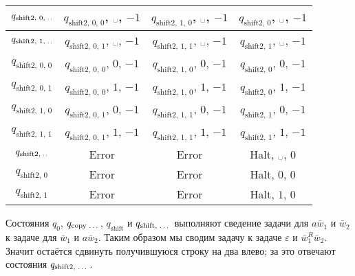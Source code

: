 \documentclass[12pt,a4paper]{article}
\newcommand{\spacesymbol}{\ensuremath{\text{\textvisiblespace}}}
\begin{document}
\begin{enumproblem}
\begin{table}[H]
\begin{tabular}{c||c|c|c}
                \hline
                $q_{\text{shift2, 0, \spacesymbol}}$& $q_{\text{shift2, 0, 0}}$, \spacesymbol, $-1$& $q_{\text{shift2, 1, 0}}$, \spacesymbol, $-1$& $q_{\text{shift2, 0}}$, \spacesymbol, $-1$\\
                \hline
                $q_{\text{shift2, 1, \spacesymbol}}$& $q_{\text{shift2, 0, 1}}$, \spacesymbol, $-1$& $q_{\text{shift2, 1, 1}}$, \spacesymbol, $-1$& $q_{\text{shift2, 1}}$, \spacesymbol, $-1$\\
                \hline
                $q_{\text{shift2, 0, 0}}$& $q_{\text{shift2, 0, 0}}$, $0$, $-1$& $q_{\text{shift2, 1, 0}}$, $0$, $-1$& $q_{\text{shift2, 0}}$, $0$, $-1$\\
                \hline
                $q_{\text{shift2, 0, 1}}$& $q_{\text{shift2, 0, 0}}$, $1$, $-1$& $q_{\text{shift2, 1, 0}}$, $1$, $-1$& $q_{\text{shift2, 0}}$, $1$, $-1$\\
                \hline
                $q_{\text{shift2, 1, 0}}$& $q_{\text{shift2, 0, 1}}$, $0$, $-1$& $q_{\text{shift2, 1, 1}}$, $0$, $-1$& $q_{\text{shift2, 1}}$, $0$, $-1$\\
                \hline
                $q_{\text{shift2, 1, 1}}$& $q_{\text{shift2, 0, 1}}$, $1$, $-1$& $q_{\text{shift2, 1, 1}}$, $1$, $-1$& $q_{\text{shift2, 1}}$, $1$, $-1$\\
                \hline
                $q_{\text{shift2, \spacesymbol}}$& Error& Error& Halt, \spacesymbol, $0$\\
                \hline
                $q_{\text{shift2, 0}}$& Error& Error& Halt, $0$, $0$\\
                \hline
                $q_{\text{shift2, 1}}$& Error& Error& Halt, $1$, $0$\\
            \end{tabular}
        \end{table}
        Состояния $q_0$, $q_{\text{copy \dots}}$, $q_{\text{shift}}$ и $q_{\text{shift, \dots}}$ выполняют сведение задачи для $a\bar{w}_1$ и $\bar{w}_2$ к задаче для $\bar{w}_1$ и $a \bar{w}_2$. Таким образом мы сводим задачу к задаче $\varepsilon$ и $\bar{w}_1^R \bar{w}_2$. Значит остаётся сдвинуть получившуюся строку на два влево; за это отвечают состояния $q_{\text{shift2, \dots}}$.


\end{enumproblem}
\end{document}
